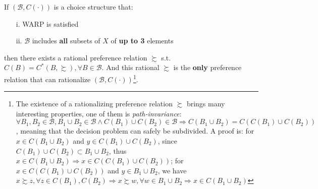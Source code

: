 \begin{theorem}\label{theorem_rationalizing_exist}
    If $(\mathcal{B},C(\cdot))$ is a choice structure that:
    \begin{enumerate}
        \item[i.] WARP is satisfied
        \item[ii.] $\mathcal{B}$ includes \textbf{all} subsets of $X$ of \textbf{up to 3} elements 
    \end{enumerate}
    then there exists a rational preference relation $\succsim$ s.t. $C(B)=C^*(B,\succsim),\forall B\in\mathcal{B}$. And this rational $\succsim$ is the \textbf{only} preference relation that can rationalize
     $(\mathcal{B},C(\cdot))$\footnote{The existence of a rationalizing preference relation $\succsim$ brings many interesting properties, one of them is \textit{path-invariance}: $\forall B_1,B_2\in\mathcal{B}, B_1\cup B_2 \in\mathcal{B}\land C(B_1)\cup C(B_2)\in\mathcal{B}\Rightarrow C(B_1\cup B_2)=C(C(B_1)\cup C(B_2))$, meaning that the decision problem can safely be subdivided. 
     A proof is: for $x\in C(B_1\cup B_2)$ and $y\in C(B_1)\cup C(B_2)$, since $C(B_1)\cup C(B_2) \subset B_1\cup B_2$, thus $x\in C(B_1\cup B_2)\Rightarrow x\in C(C(B_1)\cup C(B_2))$; for $x\in C(C(B_1)\cup C(B_2))$ and $y\in B_1\cup B_2$, we have $x\succsim z,\forall z\in C(B_1),C(B_2)\Rightarrow x\succsim w,\forall w\in B_1\cup B_2\Rightarrow x\in C(B_1\cup B_2)$}.
\end{theorem}

